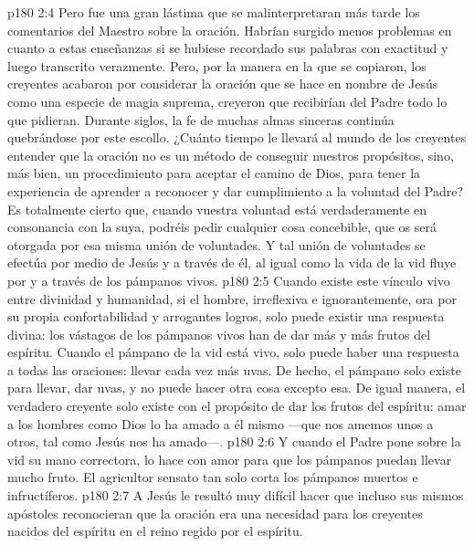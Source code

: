 \vs p180 2:4 Pero fue una gran lástima que se malinterpretaran más tarde los comentarios del Maestro sobre la oración. Habrían surgido menos problemas en cuanto a estas enseñanzas si se hubiese recordado sus palabras con exactitud y luego transcrito verazmente. Pero, por la manera en la que se copiaron, los creyentes acabaron por considerar la oración que se hace en nombre de Jesús como una especie de magia suprema, creyeron que recibirían del Padre todo lo que pidieran. Durante siglos, la fe de muchas almas sinceras continúa quebrándose por este escollo. ¿Cuánto tiempo le llevará al mundo de los creyentes entender que la oración no es un método de conseguir nuestros propósitos, sino, más bien, un procedimiento para aceptar el camino de Dios, para tener la experiencia de aprender a reconocer y dar cumplimiento a la voluntad del Padre? Es totalmente cierto que, cuando vuestra voluntad está verdaderamente en consonancia con la suya, podréis pedir cualquier cosa concebible, que os será otorgada por esa misma unión de voluntades. Y tal unión de voluntades se efectúa por medio de Jesús y a través de él, al igual como la vida de la vid fluye por y a través de los pámpanos vivos.
\vs p180 2:5 Cuando existe este vínculo vivo entre divinidad y humanidad, si el hombre, irreflexiva e ignorantemente, ora por su propia confortabilidad y arrogantes logros, solo puede existir una respuesta divina: los vástagos de los pámpanos vivos han de dar más y más frutos del espíritu. Cuando el pámpano de la vid está vivo, solo puede haber una respuesta a todas las oraciones: llevar cada vez más uvas. De hecho, el pámpano solo existe para llevar, dar uvas, y no puede hacer otra cosa excepto esa. De igual manera, el verdadero creyente solo existe con el propósito de dar los frutos del espíritu: amar a los hombres como Dios lo ha amado a él mismo ---que nos amemos unos a otros, tal como Jesús nos ha amado---.
\vs p180 2:6 Y cuando el Padre pone sobre la vid su mano correctora, lo hace con amor para que los pámpanos puedan llevar mucho fruto. El agricultor sensato tan solo corta los pámpanos muertos e infructíferos.
\vs p180 2:7 A Jesús le resultó muy difícil hacer que incluso sus mismos apóstoles reconocieran que la oración era una necesidad para los creyentes nacidos del espíritu en el reino regido por el espíritu.
